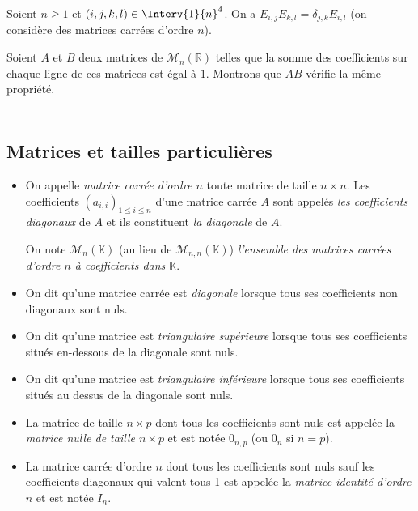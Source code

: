 \documentclass[a4paper,10pt]{report}
\begin{document}
\medskip


\begin{Proposition}{}  Soient $n \geq 1$ et $(i,j,k,l) \in \Interv{1}{n}^4$. On a $E_{i,j} E_{k,l} = \delta_{j,k} E_{i,l}$ (on considère des matrices carrées d'ordre $n$).
\end{Proposition}

\begin{Exemple} Soient $A$ et $B$ deux matrices de $\mathcal{M}_n(\mathbb{R})$ telles que la somme des coefficients sur chaque ligne de ces matrices est égal à $1$. Montrons que $AB$ vérifie la même propriété.



\end{Exemple}

\newpage

$\phantom{test}$

\vspace{4cm}
\subsection{Matrices et tailles particulières}

\begin{Definition}{}
\begin{itemize}
\item On appelle \emph{matrice carrée d'ordre $n$} toute matrice de taille $n \times n$. Les coefficients $(a_{i,i})_{1 \leq i \leq n}$ d'une matrice carrée $A$ sont appelés \emph{les coefficients diagonaux} de $A$ et ils constituent \emph{la diagonale} de $A$.

On note $\mathcal{M}_n(\mathbb{K})$ (au lieu de $\mathcal{M}_{n,n}( \mathbb{K})$) \emph{l'ensemble des matrices carrées d'ordre $n$ à coefficients dans $\mathbb{K}$}.
\item On dit qu'une matrice carrée est \emph{diagonale} lorsque tous ses coefficients non diagonaux sont nuls.
\item On dit qu'une matrice est \emph{triangulaire supérieure} lorsque tous ses coefficients situés en-dessous de la diagonale sont nuls.
\item On dit qu'une matrice est \emph{triangulaire inférieure} lorsque tous ses coefficients situés au dessus de la diagonale sont nuls.
\end{itemize}
\end{Definition}



\begin{Definition}{}
\begin{itemize}
\item La matrice de taille $n \times p$ dont tous les coefficients sont nuls est appelée la \emph{matrice nulle de taille $n \times p$} et est notée $0_{n,p}$ (ou $0_{n}$ si $n=p$).
\item La matrice carrée d'ordre $n$ dont tous les coefficients sont nuls sauf les coefficients diagonaux qui valent tous 1 est appelée la \emph{matrice identité d'ordre $n$} et est notée $I_n$.
\end{itemize}
\end{Definition}
\end{document}
